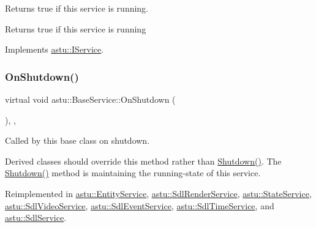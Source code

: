 Returns {\ttfamily true} if this service is running.

\begin{DoxyReturn}{Returns}
{\ttfamily true} if this service is running 
\end{DoxyReturn}


Implements \hyperlink{classastu_1_1IService_ab69225f6a613c8829c45d23158fba775}{astu\+::\+I\+Service}.

\mbox{\label{classastu_1_1BaseService_aeb5003f7c5efe5412725ac4c66942d03}} 
\subsubsection{\texorpdfstring{On\+Shutdown()}{OnShutdown()}}
{\footnotesize\ttfamily virtual void astu\+::\+Base\+Service\+::\+On\+Shutdown (\begin{DoxyParamCaption}{ }\end{DoxyParamCaption})\hspace{0.3cm}{\ttfamily [inline]}, {\ttfamily [protected]}, {\ttfamily [virtual]}}

Called by this base class on shutdown.

Derived classes should override this method rather than {\ttfamily \hyperlink{classastu_1_1BaseService_a7095888244052db294d58738c0d187fb}{Shutdown()}}. The {\ttfamily \hyperlink{classastu_1_1BaseService_a7095888244052db294d58738c0d187fb}{Shutdown()}} method is maintaining the running-\/state of this service. 

Reimplemented in \hyperlink{classastu_1_1EntityService_ac998c4d02a90460a129c8f2e0586d728}{astu\+::\+Entity\+Service}, \hyperlink{classastu_1_1SdlRenderService_a4f21478ca10de11d260792c3ccd79eef}{astu\+::\+Sdl\+Render\+Service}, \hyperlink{classastu_1_1StateService_ad8fa5b6d52bd795ebba450f119540d87}{astu\+::\+State\+Service}, \hyperlink{classastu_1_1SdlVideoService_a6d6085e9ff213c5d41546d604ff53e92}{astu\+::\+Sdl\+Video\+Service}, \hyperlink{classastu_1_1SdlEventService_a0163bd191605b5068d93cd6c8f26da0c}{astu\+::\+Sdl\+Event\+Service}, \hyperlink{classastu_1_1SdlTimeService_a6a1b864beed186413933dd8b97a393a2}{astu\+::\+Sdl\+Time\+Service}, and \hyperlink{classastu_1_1SdlService_a20d53237efd1c717d773a8ff121b093b}{astu\+::\+Sdl\+Service}.

\mbox{\label{classastu_1_1BaseService_ac8710cd2d6dcc990db65e7c8ccfbc5ff}} 

